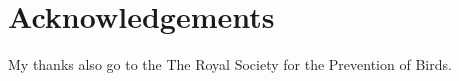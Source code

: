 \chapter{Acknowledgements}

My thanks also go to the The Royal Society for the Prevention of Birds.
